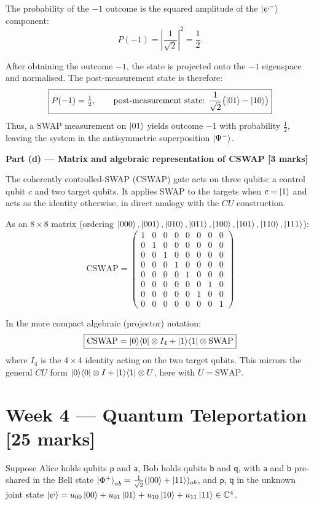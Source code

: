 \documentclass[12pt,a4paper]{article}
\begin{document}
The probability of the $-1$ outcome is the squared amplitude of the $\ket{\psi^-}$ component:
\[
  P(-1) = \left|\frac{1}{\sqrt{2}}\right|^2 = \frac{1}{2}.
\]

After obtaining the outcome $-1$, the state is projected onto the $-1$ eigenspace and normalised.
The post-measurement state is therefore:
\[
  \boxed{P(-1) = \tfrac{1}{2}, \qquad
  \text{post-measurement state: }\frac{1}{\sqrt{2}}\bigl(\ket{01}-\ket{10}\bigr)}
\]
Thus, a SWAP measurement on $\ket{01}$ yields outcome $-1$ with probability $\tfrac{1}{2}$, leaving the system in the antisymmetric superposition $\ket{\Psi^-}$.

\medskip
\textbf{Part (d) --- Matrix and algebraic representation of CSWAP [3 marks]}

\medskip
The coherently controlled-SWAP (CSWAP) gate acts on three qubits: a control qubit $c$ and two target qubits.
It applies SWAP to the targets when $c=\ket{1}$ and acts as the identity otherwise, in direct analogy with the $CU$ construction.

As an $8\times8$ matrix (ordering $\ket{000},\ket{001},\ket{010},\ket{011},\ket{100},\ket{101},\ket{110},\ket{111}$):
\[
  \mathrm{CSWAP} =
  \begin{pmatrix}
    1&0&0&0&0&0&0&0\\
    0&1&0&0&0&0&0&0\\
    0&0&1&0&0&0&0&0\\
    0&0&0&1&0&0&0&0\\
    0&0&0&0&1&0&0&0\\
    0&0&0&0&0&0&1&0\\
    0&0&0&0&0&1&0&0\\
    0&0&0&0&0&0&0&1
  \end{pmatrix}
\]

In the more compact algebraic (projector) notation:
\[
  \boxed{\mathrm{CSWAP} = \ket{0}\!\bra{0}\otimes I_4 + \ket{1}\!\bra{1}\otimes \mathrm{SWAP}}
\]
where $I_4$ is the $4\times4$ identity acting on the two target qubits.
This mirrors the general $CU$ form $\ket{0}\!\bra{0}\otimes I+\ket{1}\!\bra{1}\otimes U$, here with $U=\mathrm{SWAP}$.

\section*{Week 4 --- Quantum Teleportation [25 marks]}

Suppose Alice holds qubits $\mathsf{p}$ and $\mathsf{a}$, Bob holds qubits $\mathsf{b}$ and $\mathsf{q}$,
with $\mathsf{a}$ and $\mathsf{b}$ pre-shared in the Bell state
$\ket{\Phi^+}_{ab}=\tfrac{1}{\sqrt{2}}(\ket{00}+\ket{11})_{ab}$,
and $\mathsf{p}$, $\mathsf{q}$ in the unknown joint state
$\ket{\psi}=u_{00}\ket{00}+u_{01}\ket{01}+u_{10}\ket{10}+u_{11}\ket{11}\in\mathbb{C}^4$.
\end{document}
